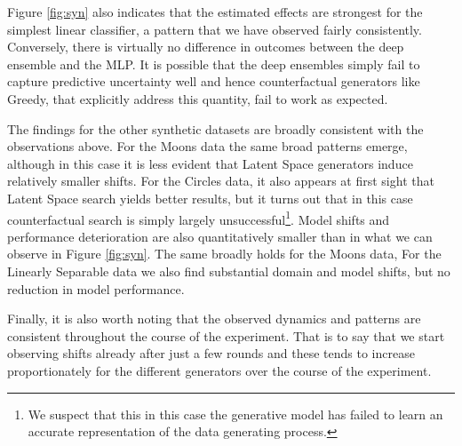 \documentclass[conference,final,]{IEEEtran}
\theoremstyle{definition}
\theoremstyle{definition}
\theoremstyle{definition}
\theoremstyle{definition}
\theoremstyle{remark}
\begin{document}
Figure \ref{fig:syn} also indicates that the estimated effects are strongest for the simplest linear classifier, a pattern that we have observed fairly consistently. Conversely, there is virtually no difference in outcomes between the deep ensemble and the MLP. It is possible that the deep ensembles simply fail to capture predictive uncertainty well and hence counterfactual generators like Greedy, that explicitly address this quantity, fail to work as expected.

The findings for the other synthetic datasets are broadly consistent with the observations above. For the Moons data the same broad patterns emerge, although in this case it is less evident that Latent Space generators induce relatively smaller shifts. For the Circles data, it also appears at first sight that Latent Space search yields better results, but it turns out that in this case counterfactual search is simply largely unsuccessful\footnote{We suspect that this in this case the generative model has failed to learn an accurate representation of the data generating process.}. Model shifts and performance deterioration are also quantitatively smaller than in what we can observe in Figure \ref{fig:syn}. The same broadly holds for the Moons data, For the Linearly Separable data we also find substantial domain and model shifts, but no reduction in model performance.

Finally, it is also worth noting that the observed dynamics and patterns are consistent throughout the course of the experiment. That is to say that we start observing shifts already after just a few rounds and these tends to increase proportionately for the different generators over the course of the experiment.
\end{document}
